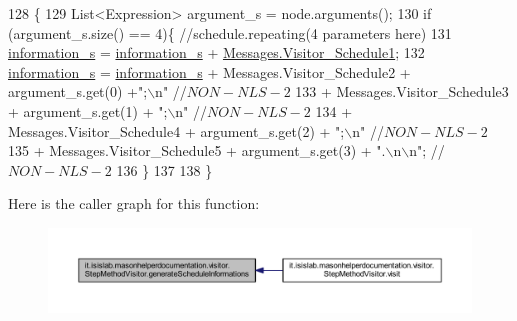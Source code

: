 \begin{DoxyCode}
128                                                                      \{
129         List<Expression> argument\_s = node.arguments();
130         \textcolor{keywordflow}{if} (argument\_s.size() == 4)\{    \textcolor{comment}{//schedule.repeating(4 parameters here)}
131             \hyperlink{classit_1_1isislab_1_1masonhelperdocumentation_1_1visitor_1_1_step_method_visitor_adf58f8f5068e330783c3c4bd78080f1a}{information\_s} = \hyperlink{classit_1_1isislab_1_1masonhelperdocumentation_1_1visitor_1_1_step_method_visitor_adf58f8f5068e330783c3c4bd78080f1a}{information\_s} + 
      \hyperlink{classit_1_1isislab_1_1masonhelperdocumentation_1_1visitor_1_1_messages_a50822a1d6f5dd658aac1c947608b524b}{Messages.Visitor\_Schedule1};
132             \hyperlink{classit_1_1isislab_1_1masonhelperdocumentation_1_1visitor_1_1_step_method_visitor_adf58f8f5068e330783c3c4bd78080f1a}{information\_s} = \hyperlink{classit_1_1isislab_1_1masonhelperdocumentation_1_1visitor_1_1_step_method_visitor_adf58f8f5068e330783c3c4bd78080f1a}{information\_s} + Messages.Visitor\_Schedule2 + 
      argument\_s.get(0) +\textcolor{stringliteral}{";\(\backslash\)n"} \textcolor{comment}{//$NON-NLS-2$}
133                                 + Messages.Visitor\_Schedule3 + argument\_s.get(1) + \textcolor{stringliteral}{";\(\backslash\)n"} \textcolor{comment}{//$NON-NLS-2$}
134                                 + Messages.Visitor\_Schedule4 + argument\_s.get(2) + \textcolor{stringliteral}{";\(\backslash\)n"} \textcolor{comment}{//$NON-NLS-2$}
135                                 + Messages.Visitor\_Schedule5 + argument\_s.get(3) + \textcolor{stringliteral}{".\(\backslash\)n\(\backslash\)n"}; \textcolor{comment}{//$NON-NLS-2$}
136         \}
137         
138     \}
\end{DoxyCode}


Here is the caller graph for this function\-:
\nopagebreak
\begin{figure}[H]
\begin{center}
\leavevmode
\includegraphics[width=350pt]{classit_1_1isislab_1_1masonhelperdocumentation_1_1visitor_1_1_step_method_visitor_aecf5552414bc7ba6913a5e026c6048cd_icgraph}
\end{center}
\end{figure}



